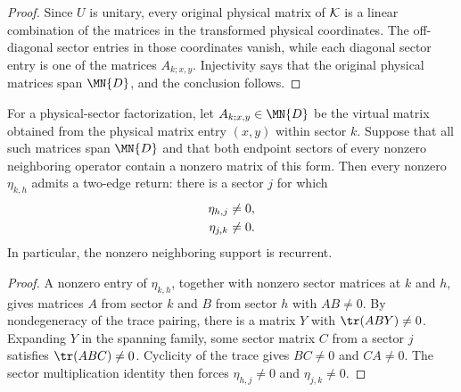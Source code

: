 \begin{proof}
    \leanok
    Since $U$ is unitary, every original physical matrix of ${\cal K}$ is a
    linear combination of the matrices in the transformed physical
    coordinates. The off-diagonal sector entries in those coordinates vanish,
    while each diagonal sector entry is one of the matrices $A_{k;x,y}$.
    Injectivity says that the original physical matrices span $\MN{D}$, and
    the conclusion follows.
\end{proof}

\begin{lemma}%
    \label{thm:mpdo_sector_support_triangle_closure}
    \leanok
    For a physical-sector factorization, let $A_{k;x,y}\in\MN{D}$ be the
    virtual matrix obtained from the physical matrix entry $(x,y)$ within
    sector $k$. Suppose that all such matrices span $\MN{D}$ and that both
    endpoint sectors of every nonzero neighboring operator contain a nonzero
    matrix of this form. Then every nonzero $\eta_{k,h}$ admits a two-edge
    return: there is a sector $j$ for which
    \begin{align}
        \eta_{h,j} & \ne0,
        \notag             \\
        \eta_{j,k} & \ne0.
        \notag
    \end{align}
    In particular, the nonzero neighboring support is recurrent.
\end{lemma}

\begin{proof}
    \leanok
    A nonzero entry of $\eta_{k,h}$, together with nonzero sector matrices at
    $k$ and $h$, gives matrices $A$ from sector $k$ and $B$ from sector $h$
    with $AB\ne0$. By nondegeneracy of the trace pairing, there is a matrix
    $Y$ with $\tr(ABY)\ne0$. Expanding $Y$ in the spanning family, some sector
    matrix $C$ from a sector $j$ satisfies $\tr(ABC)\ne0$. Cyclicity of the
    trace gives $BC\ne0$ and $CA\ne0$. The sector multiplication identity then
    forces $\eta_{h,j}\ne0$ and $\eta_{j,k}\ne0$.
\end{proof}

